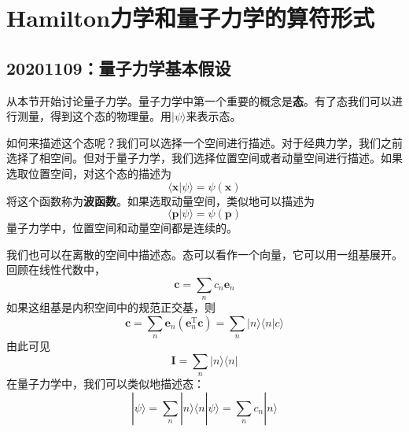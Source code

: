 \chapter{Hamilton力学和量子力学的算符形式}
    \section{20201109：量子力学基本假设}
        从本节开始讨论量子力学。量子力学中第一个重要的概念是\textbf{态}。有了态我们可以进行测量，得到这个态的物理量。用$| \psi \rangle$来表示态。

        如何来描述这个态呢？我们可以选择一个空间进行描述。对于经典力学，我们之前选择了相空间。但对于量子力学，我们选择位置空间或者动量空间进行描述。如果选取位置空间，对这个态的描述为
        \begin{equation}
            \langle \bm{x} | \psi \rangle = \psi(\bm{x})
        \end{equation}
        将这个函数称为\textbf{波函数}。如果选取动量空间，类似地可以描述为
        \begin{equation}
            \langle \bm{p} | \psi \rangle = \psi(\bm{p})
        \end{equation}
        量子力学中，位置空间和动量空间都是连续的。

        我们也可以在离散的空间中描述态。态可以看作一个向量，它可以用一组基展开。回顾在线性代数中，
        \begin{equation}
            \bm{c} = \sum_n c_n \bm{e}_n
        \end{equation}
        如果这组基是内积空间中的规范正交基，则
        \begin{equation}
            \bm{c} = \sum_n \bm{e}_n (\bm{e}_n^\mathrm{T}\bm{c}) 
            = \sum_n |n\rangle \langle n|c\rangle
        \end{equation}
        由此可见
        \begin{equation}
            \bm{I} = \sum_n |n\rangle \langle n|
        \end{equation}
        在量子力学中，我们可以类似地描述态：
        \begin{equation}
            |\psi \rangle = \sum_n |n\rangle \langle n|\psi \rangle = \sum_n c_n |n\rangle
        \end{equation}

